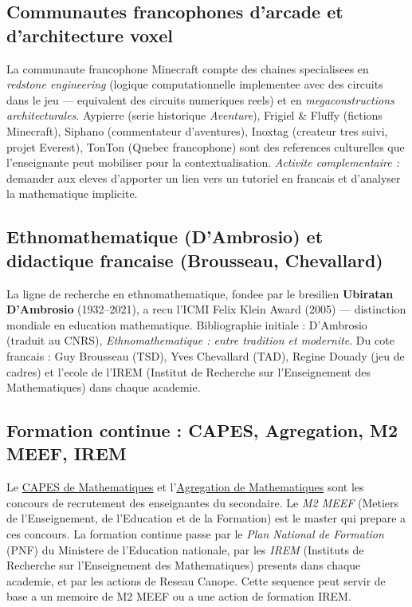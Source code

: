 \documentclass[12pt,a4paper]{scrartcl}
\newcommand{\acc}[1]{\textcolor{accent}{\textbf{#1}}}
\begin{document}
\subsection{Communautes francophones d'arcade et d'architecture voxel}

La communaute francophone Minecraft compte des chaines specialisees en \emph{redstone engineering} (logique computationnelle implementee avec des circuits dans le jeu --- equivalent des circuits numeriques reels) et en \emph{megaconstructions architecturales}. Aypierre (serie historique \emph{Aventure}), Frigiel \& Fluffy (fictions Minecraft), Siphano (commentateur d'aventures), Inoxtag (createur tres suivi, projet Everest), TonTon (Quebec francophone) sont des references culturelles que l'enseignant\textperiodcentered e peut mobiliser pour la contextualisation. \emph{Activite complementaire :} demander aux eleves d'apporter un lien vers un tutoriel en francais et d'analyser la mathematique implicite.

\subsection{Ethnomathematique (D'Ambrosio) et didactique francaise (Brousseau, Chevallard)}

La ligne de recherche en ethnomathematique, fondee par le bresilien \acc{Ubiratan D'Ambrosio} (1932--2021), a recu l'ICMI Felix Klein Award (2005) --- distinction mondiale en education mathematique. Bibliographie initiale : D'Ambrosio (traduit au CNRS), \emph{Ethnomathematique : entre tradition et modernite}. Du cote francais : Guy Brousseau (TSD), Yves Chevallard (TAD), Regine Douady (jeu de cadres) et l'ecole de l'IREM (Institut de Recherche sur l'Enseignement des Mathematiques) dans chaque academie.

\subsection{Formation continue : CAPES, Agregation, M2 MEEF, IREM}

Le \href{https://www.devenirenseignant.gouv.fr/}{CAPES de Mathematiques} et l'\href{https://www.devenirenseignant.gouv.fr/}{Agregation de Mathematiques} sont les concours de recrutement des enseignant\textperiodcentered es du secondaire. Le \emph{M2 MEEF} (Metiers de l'Enseignement, de l'Education et de la Formation) est le master qui prepare a ces concours. La formation continue passe par le \emph{Plan National de Formation} (PNF) du Ministere de l'Education nationale, par les \emph{IREM} (Instituts de Recherche sur l'Enseignement des Mathematiques) presents dans chaque academie, et par les actions de Reseau Canope. Cette sequence peut servir de base a un memoire de M2 MEEF ou a une action de formation IREM.
\end{document}
